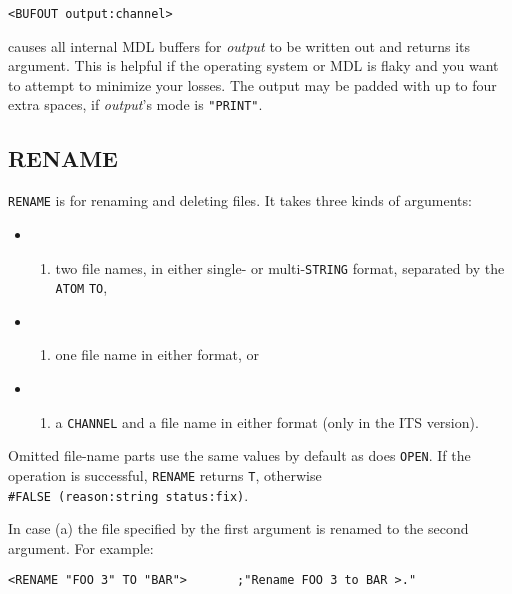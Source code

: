 \documentclass[a4paper]{scrbook}
\providecommand{\tightlist}{%
  \setlength{\itemsep}{0pt}\setlength{\parskip}{0pt}}
\begin{document}
\begin{verbatim}
<BUFOUT output:channel>
\end{verbatim}

 causes all internal MDL buffers for \emph{output} to be written out and returns its
argument. This is helpful if the operating system or MDL is flaky and you want to attempt to minimize your losses. The
output may be padded with up to four extra spaces, if \emph{output}'s mode is \texttt{"PRINT"}.

\subsection{RENAME}\label{rename}

 \texttt{RENAME} is for renaming and deleting files. It takes three kinds of arguments:

\begin{itemize}
\item
  \begin{enumerate}
  \def\labelenumi{(\alph{enumi})}
  \tightlist
  \item
    two file names, in either single- or multi-\texttt{STRING} format, separated by the \texttt{ATOM}
    \texttt{TO},
  \end{enumerate}
\item
  \begin{enumerate}
  \def\labelenumi{(\alph{enumi})}
  \setcounter{enumi}{1}
  \tightlist
  \item
    one file name in either format, or
  \end{enumerate}
\item
  \begin{enumerate}
  \def\labelenumi{(\alph{enumi})}
  \setcounter{enumi}{2}
  \tightlist
  \item
    a \texttt{CHANNEL} and a file name in either format (only in the ITS version).
  \end{enumerate}
\end{itemize}

Omitted file-name parts use the same values by default as does \texttt{OPEN}. If the operation is successful,
\texttt{RENAME} returns \texttt{T}, otherwise \texttt{\#FALSE\ (reason:string\ status:fix)}.

In case (a) the file specified by the first argument is renamed to the second argument. For example:

\begin{verbatim}
<RENAME "FOO 3" TO "BAR">       ;"Rename FOO 3 to BAR >."
\end{verbatim}
\end{document}
